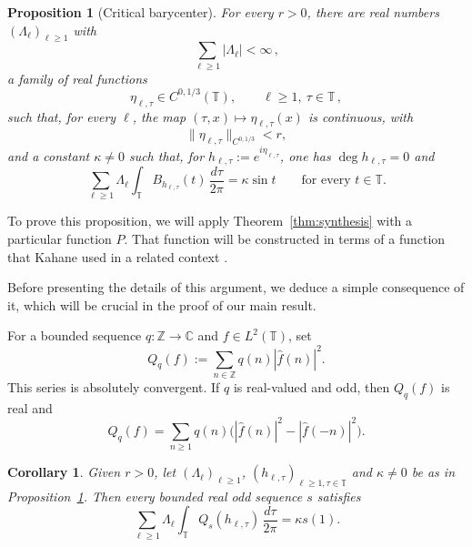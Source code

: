 \documentclass[10pt,a4paper]{amsart}
\newtheorem{proposition}[theorem]{Proposition}
\newtheorem{corollary}[theorem]{Corollary}
\newcommand{\T}{\mathbb T}
\newcommand{\Z}{\mathbb Z}
\newcommand{\C}{\mathbb C}
\newcommand{\wh}{\widehat}
\DeclareMathOperator{\degmap}{deg}
\begin{document}
\begin{proposition}[Critical barycenter]\label{prop:critical-barycenter}
For every $r>0$, there are real numbers $(\Lambda_\ell)_{\ell\geq1}$ with
\begin{equation}\label{eq:Lambda-l1}
 \sum_{\ell\geq1}|\Lambda_\ell|<\infty \,,
\end{equation}
a family of real functions
\[
 \eta_{\ell,\tau}\in C^{0,1/3}(\T),
 \qquad \ell\geq1,\ \tau\in\T \,,
\]
such that, for every $\ell$, the map $(\tau,x)\mapsto\eta_{\ell,\tau}(x)$ is continuous, with
\begin{equation}\label{eq:small-barycenter-phases}
 \|\eta_{\ell,\tau}\|_{C^{0,1/3}}<r,
\end{equation}
and a constant $\kappa\ne0$ such that, for $h_{\ell,\tau}:=e^{i\eta_{\ell,\tau}}$, one has $\degmap h_{\ell,\tau}=0$ and
\begin{equation}\label{eq:critical-barycenter}
 \sum_{\ell\geq1}\Lambda_\ell
 \int_\T B_{h_{\ell,\tau}}(t)\,\frac{d\tau}{2\pi}
 =\kappa\sin t
 \qquad\text{for every }t\in\T.
\end{equation}
\end{proposition}

To prove this proposition, we will apply Theorem~\ref{thm:synthesis} with a particular function $P$. That function will be constructed in terms of a function that Kahane used in a related context \cite{Kahane2005}.

Before presenting the details of this argument, we deduce a simple consequence of it, which will be crucial in the proof of our main result.

For a bounded sequence $q:\Z\to\C$ and $f\in L^2(\T)$, set
\begin{equation}\label{eq:Qq}
 Q_q(f):=\sum_{n\in\Z}q(n)|\wh f(n)|^2.
\end{equation}
This series is absolutely convergent. If $q$ is real-valued and odd, then
$Q_q(f)$ is real and
\begin{equation}\label{eq:Qq-odd}
 Q_q(f)
 =\sum_{n\geq1}q(n)
 \big(|\wh f(n)|^2-|\wh f(-n)|^2\big).
\end{equation}

\begin{corollary}\label{cor:barycenter-multiplier}
Given $r>0$, let $(\Lambda_\ell)_{\ell\geq1}$, $(h_{\ell,\tau})_{\ell\geq 1, \tau\in\T}$ and $\kappa\neq 0$ be as in Proposition~\ref{prop:critical-barycenter}. Then every bounded real odd sequence $s$ satisfies
\begin{equation}\label{eq:barycenter-Q}
 \sum_{\ell\geq1}\Lambda_\ell
 \int_\T Q_s(h_{\ell,\tau})\,\frac{d\tau}{2\pi}
 =\kappa s(1).
\end{equation}
\end{corollary}
\end{document}
